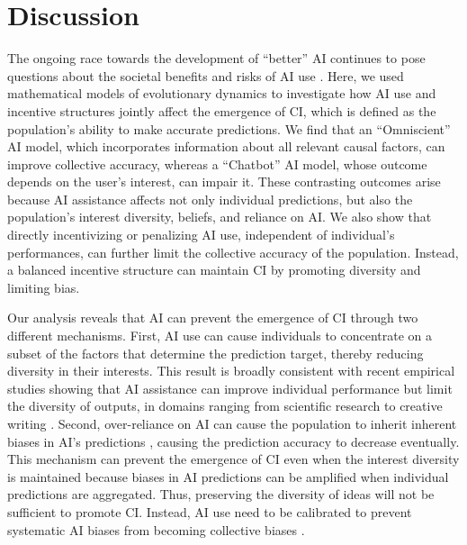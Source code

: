 \documentclass[12pt]{article}
\begin{document}
\section*{Discussion}

The ongoing race towards the development of ``better'' AI continues to pose questions about the societal benefits and risks of AI use \citep{bender2021dangers,burton2024large,cui2024ai}.
Here, we used mathematical models of evolutionary dynamics to investigate how AI use and incentive structures jointly affect the emergence of CI, which is defined as the population's ability to make accurate predictions.
We find that an ``Omniscient'' AI model, which incorporates information about all relevant causal factors, can improve collective accuracy, whereas a ``Chatbot'' AI model, whose outcome depends on the user's interest, can impair it.
These contrasting outcomes arise because AI assistance affects not only individual predictions, but also the population's interest diversity, beliefs, and reliance on AI.
We also show that directly incentivizing or penalizing AI use, independent of individual's performances, can further limit the collective accuracy of the population. 
Instead, a balanced incentive structure can maintain CI by promoting diversity and limiting bias.

Our analysis reveals that AI can prevent the emergence of CI through two different mechanisms.
First, AI use can cause individuals to concentrate on a subset of the factors that determine the prediction target, thereby reducing diversity in their interests.
This result is broadly consistent with recent empirical studies showing that AI assistance can improve individual performance but limit the diversity of outputs, in domains ranging from scientific research \citep{hao2026artificial} to creative writing \citep{doshi2024generative}.
Second, over-reliance on AI can cause the population to inherit inherent biases in AI's predictions \citep{fugener2021will,vicente2023humans}, causing the prediction accuracy to decrease eventually.
This mechanism can prevent the emergence of CI even when the interest diversity is maintained because biases in AI predictions can be amplified when individual predictions are aggregated.
Thus, preserving the diversity of ideas will not be sufficient to promote CI.
Instead, AI use need to be calibrated to prevent systematic AI biases from becoming collective biases \citep{buccinca2021trust}.
\end{document}
